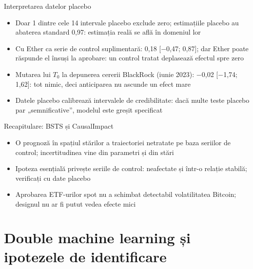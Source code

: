\begin{frame}{Interpretarea datelor placebo}
\itemsize{\small}
\begin{itemize}
    \item Doar 1 dintre cele 14 intervale placebo exclude zero; estimațiile placebo au abaterea standard 0{,}97: estimația reală se află în domeniul lor
    \item Cu Ether ca serie de control suplimentară: 0{,}18 [\ensuremath{-}0{,}47; 0{,}87]; dar Ether poate răspunde el însuși la aprobare: un control tratat deplasează efectul spre zero
    \item Mutarea lui $T_0$ la depunerea cererii BlackRock (iunie 2023): \ensuremath{-}0{,}02 [\ensuremath{-}1{,}74; 1{,}62]: tot nimic, deci anticiparea nu ascunde un efect mare
    \item Datele placebo calibrează intervalele de credibilitate: dacă multe teste placebo par „semnificative”, modelul este greșit specificat
\end{itemize}
\end{frame}

\begin{frame}{Recapitulare: BSTS și CausalImpact}
\itemsize{\small}
\begin{itemize}
    \item O prognoză în spațiul stărilor a traiectoriei netratate pe baza seriilor de control; incertitudinea vine din parametri și din stări
    \item Ipoteza esențială privește seriile de control: neafectate și într-o relație stabilă; verificați cu date placebo
    \item Aprobarea ETF-urilor spot nu a schimbat detectabil volatilitatea Bitcoin; designul nu ar fi putut vedea efecte mici
\end{itemize}
\end{frame}


\section{Double machine learning și ipotezele de identificare}

